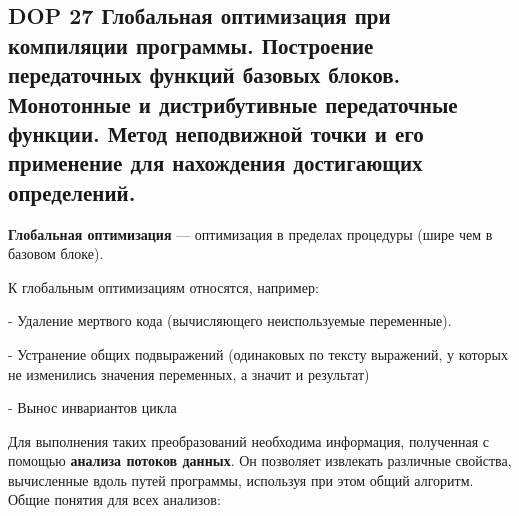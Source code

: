 \subsection{DOP 27 Глобальная оптимизация при компиляции программы. Построение передаточных функций базовых блоков. Монотонные и дистрибутивные передаточные функции. Метод неподвижной точки и его применение для нахождения достигающих определений.}

\textbf{Глобальная оптимизация} --- оптимизация в пределах процедуры (шире чем в базовом блоке).

К глобальным оптимизациям относятся, например:

- Удаление мертвого кода (вычисляющего неиспользуемые переменные).

- Устранение общих подвыражений (одинаковых по тексту выражений, у которых не изменились значения переменных, а значит и результат)

- Вынос инвариантов цикла


Для выполнения таких преобразований необходима информация, полученная с помощью \textbf{анализа потоков данных}. Он позволяет извлекать различные свойства, вычисленные вдоль путей программы, используя при этом общий алгоритм. Общие понятия для всех анализов:

